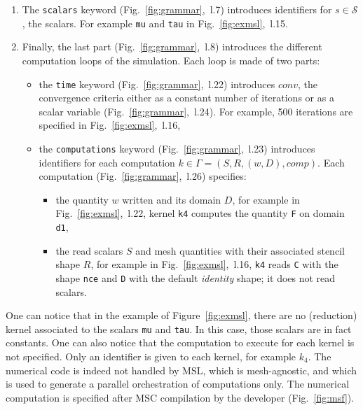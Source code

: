 \begin{enumerate}
\item The \texttt{scalars} keyword (Fig.~\ref{fig:grammar},~l.7) introduces identifiers for $s\in\mathcal{S}$, the scalars. For example \texttt{mu} and \texttt{tau} in Fig.~\ref{fig:exmsl},~l.15. 

\item Finally, the last part (Fig.~\ref{fig:grammar},~l.8) introduces the different computation loops of the simulation. Each loop is made of two parts:
\begin{itemize}
\item the \texttt{time} keyword (Fig.~\ref{fig:grammar},~l.22) introduces $conv$, the convergence criteria either as a constant number of iterations or as a scalar variable (Fig.~\ref{fig:grammar},~l.24). For example, 500 iterations are specified in Fig.~\ref{fig:exmsl},~l.16,
\item the \texttt{computations} keyword (Fig.~\ref{fig:grammar},~l.23) introduces identifiers for each computation $k\in\Gamma=(S,R,(w,D),comp)$. Each computation (Fig.~\ref{fig:grammar},~l.26) specifies:
\begin{itemize}
 \item the quantity $w$ written and its domain $D$, for example in Fig.~\ref{fig:exmsl},~l.22, kernel \texttt{k4} computes the quantity \texttt{F} on domain \texttt{d1},
 \item the read scalars $S$ and mesh quantities with their associated stencil shape $R$, for example in Fig.~\ref{fig:exmsl},~l.16, \texttt{k4} reads \texttt{C} with the shape \texttt{nce} and \texttt{D} with the default \textit{identity} shape; it does not read scalars.
 \end{itemize}
\end{itemize}
\end{enumerate}

One can notice that in the example of Figure~\ref{fig:exmsl}, there are no (reduction) kernel associated to the scalars \texttt{mu} and \texttt{tau}.
In this case, those scalars are in fact constants.
One can also notice that the computation to execute for each kernel is not specified. Only an identifier is given to each kernel, for example $k_4$. The numerical code is indeed not handled by MSL, which is mesh-agnostic, and which is used to generate a parallel orchestration of computations only. The numerical computation is specified after MSC compilation by the developer (Fig.~\ref{fig:msf}).
